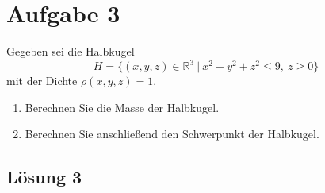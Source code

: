 \documentclass[main.tex]{subfiles}
\begin{document}
\section{Aufgabe 3}
Gegeben sei die Halbkugel
\[
H = \{ (x,y,z) \in \mathbb{R}^3 \ | \ x^2 + y^2 + z^2 \leq 9, \ z \geq 0 \}
\]
mit der Dichte $\rho(x,y,z) = 1$.
\begin{enumerate}
\item Berechnen Sie die Masse der Halbkugel.
\item Berechnen Sie anschließend den Schwerpunkt der Halbkugel.
\end{enumerate}

\subsection{Lösung 3}
\end{document}
